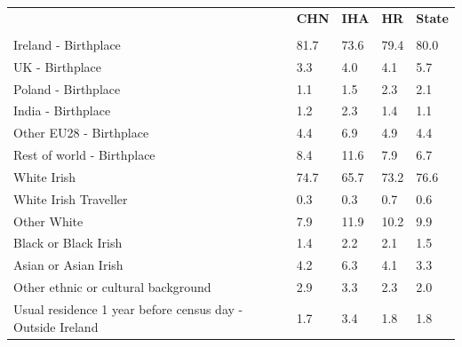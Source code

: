 \documentclass{article}
\begin{document}
\pagebreak
\begin{table}[h]	
\centering
		\begin{tabular}{KTTTT}
  \hline
& \textbf{CHN} & \textbf{IHA} & \textbf{HR}& \textbf{State}\\ 
  \hline
    \\ 
    \hline
Ireland - Birthplace & 81.7& 73.6& 79.4& 80.0\\
UK - Birthplace & 3.3& 4.0& 4.1& 5.7\\
Poland - Birthplace & 1.1& 1.5& 2.3& 2.1\\
India - Birthplace & 1.2& 2.3& 1.4& 1.1\\
Other EU28 - Birthplace & 4.4& 6.9& 4.9& 4.4\\
Rest of world - Birthplace &  8.4& 11.6&  7.9&  6.7\\
    \hline
White Irish & 74.7& 65.7& 73.2& 76.6\\
White Irish Traveller & 0.3& 0.3& 0.7& 0.6\\
Other White &  7.9& 11.9& 10.2&  9.9\\
Black or Black Irish & 1.4& 2.2& 2.1& 1.5\\
Asian or Asian Irish & 4.2& 6.3& 4.1& 3.3\\
Other ethnic or cultural background & 2.9& 3.3& 2.3& 2.0\\
    \hline
Usual residence 1 year before census day - Outside Ireland & 1.7& 3.4& 1.8& 1.8\\


\end{tabular}
\end{table}
\end{document}
